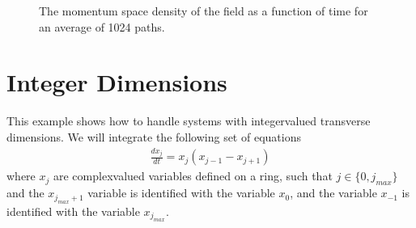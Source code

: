 \documentclass[letterpaper,10pt,english]{sphinxmanual}
\begin{document}
\begin{figure}[htbp]
\centering
\capstart

\noindent{}
\caption{The momentum space density of the field as a function of time for an average of 1024 paths.}\label{\detokenize{worked_examples:id4}}\end{figure}

\ignorespaces 

\section{Integer Dimensions}
\label{\detokenize{worked_examples:integer-dimensions}}\label{\detokenize{worked_examples:integerdimensionexample}}\label{\detokenize{worked_examples:index-8}}
\sphinxAtStartPar
This example shows how to handle systems with integer\sphinxhyphen{}valued transverse dimensions.  We will integrate the following set of equations
\begin{equation*}
\begin{split}\frac{dx_j}{dt} = x_j \left(x_{j-1}-x_{j+1}\right)\end{split}
\end{equation*}
\sphinxAtStartPar
where \(x_j\) are complex\sphinxhyphen{}valued variables defined on a ring, such that \(j\in \{0,j_{max}\}\) and the \(x_{j_{max}+1}\) variable is identified with the variable \(x_{0}\), and the variable \(x_{-1}\) is identified with the variable \(x_{j_{max}}\).
\end{document}
